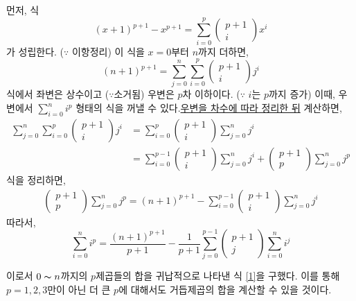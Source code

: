 \documentclass[a0,portrait]{a0poster}
\begin{document}
\begin{multicols}{2}
먼저, 식
\[(x+1)^{p+1}-x^{p+1}=\sum_{i=0}^{p}\begin{pmatrix}p+1\\i\end{pmatrix}x^i\] 
가 성립한다. ($\because$ 이항정리) 이 식을 $x=0$부터 $n$까지 더하면, 
\[(n+1)^{p+1}=\sum_{j=0}^n\sum_{i=0}^p\begin{pmatrix}p+1\\i\end{pmatrix}j^i\] 
식에서 좌변은 상수이고 ($\because$소거됨) 우변은 $p$차 이하이다. ($\because$ $i$는 $p$까지 증가) 이때, 우변에서 $\sum_{i=0}^{n}i^p$ 형태의 식을 꺼낼 수 있다.\underline{우변을 차수에 따라 정리한 뒤} 계산하면,
\begin{align*}
\sum_{j=0}^n\sum_{i=0}^p\begin{pmatrix}p+1\\i\end{pmatrix}j^i&=\sum_{i=0}^p\begin{pmatrix}p+1\\i\end{pmatrix}\sum_{j=0}^{n}j^i \\
&=\sum_{i=0}^{p-1}\begin{pmatrix}p+1\\i\end{pmatrix}\sum_{j=0}^{n}j^i+\begin{pmatrix}p+1\\p\end{pmatrix}\sum_{j=0}^{n}j^p 
\end{align*}
식을 정리하면,
\begin{align*}
\begin{pmatrix}p+1\\p\end{pmatrix}\sum_{j=0}^{n}j^p=(n+1)^{p+1}-\sum_{i=0}^{p-1}\begin{pmatrix}p+1\\i\end{pmatrix}\sum_{j=0}^{n}j^i
\end{align*}
따라서,
\begin{equation}
\sum_{i=0}^{n}i^p=\frac{(n+1)^{p+1}}{p+1}-\frac{1}{p+1}\sum_{j=0}^{p-1}\begin{pmatrix}p+1\\j\end{pmatrix}\sum_{i=0}^{n}i^j
\label{1}
\end{equation}

\vspace{1cm}
이로서 $0\thicksim n$까지의 $p$제곱들의 합을 귀납적으로 나타낸 식 \ref{1}을 구했다. 이를 통해 $p=1,2,3$만이 아닌 더 큰 $p$에 대해서도 거듭제곱의 합을 계산할 수 있을 것이다.


\end{multicols}
\end{document}
